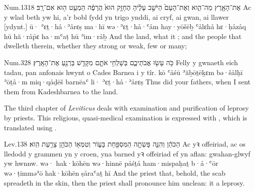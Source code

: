 \begin{example}{Num.}{13}{18}{}{}
	\quoling
	{ אֶת־הָאָ֖רֶץ מַה־הִ֑וא וְאֶת־הָעָם֙ הַיֹּשֵׁ֣ב עָלֶ֔יהָ הֶחָזָ֥ק הוּא֙ הֲרָפֶ֔ה הַמְעַ֥ט ה֖וּא אִם־רָֽב׃}
	{Ac  y wlad beth yw hi, a’r bobl ſydd yn trigo ynddi, ai cryf, ai gwan, ai llawer [ydynt.]}
	{ū· ʾɛṯ·hå·ʾårɛṣ ma·hī wə·ʾɛṯ·hå·ʿåm hay·yōšēḇ ʿålɛhå hɛ·ḥåzåq hū hă·råp̄ɛ ha·mʿaṭ hū ʾim·råḇ}
	{And  the land, what it ; and the people that dwelleth therein, whether they  strong or weak, few or many;}
\end{example}

\begin{example}{Num.}{32}{8}{}{}
	\quoling
	{כֹּ֥ה עָשׂ֖וּ אֲבֹתֵיכֶ֑ם בְּשָׁלְחִ֥י אֹתָ֛ם מִקָּדֵ֥שׁ בַּרְנֵ֖עַ  אֶת־הָאָֽרֶץ׃}
	{Felly y gwnaeth eich tadau, pan anfonais hwynt o Cades Barnea i  y tîr.}
	{kō ʿåśū ʾăḇōṯēḵɛm bə·šålḥī ʾōṯå·m miq·qåḏēš barnēaʿ li· ʾɛṯ·hå·ʾårɛṣ}
	{Thus did your fathers, when I sent them from Kadeshbarnea to  the land.}
\end{example}




\begin{paper}
	The third chapter of \emph{Leviticus} deals with examination and purification of leprosy by priests. This religious, quasi-medical examination is expressed with , which is translated using .
\end{paper}

\begin{example}{Lev.}{13}{8}{}{}
	\quoling
	{ הַכֹּהֵ֔ן וְהִנֵּ֛ה פָּשְׂתָ֥ה הַמִּסְפַּ֖חַת בָּע֑וֹר וְטִמְּא֥וֹ הַכֹּהֵ֖ן צָרַ֥עַת הִֽוא׃}
	{Ac  yꝛ offeiriad, ac os lledodd y grammen yn y croen, yna barned yꝛ offeiriad ef yn aflan: gwahan-glwyf yw hwnnw.}
	{wə· hak·kōhēn wə·hinnē påśṯå ham·mispaḥaṯ b·å·ʿōr wə·ṭimməʾō hak·kōhēn ṣåraʿaṯ hī}
	{And  the priest  that, behold, the scab spreadeth in the skin, then the priest shall pronounce him unclean: it  a leprosy.}
\end{example}






